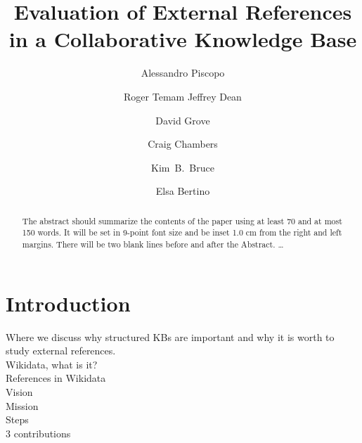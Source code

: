 \documentclass{llncs}
\begin{document}
%
\frontmatter          %
%
\pagestyle{headings}  %
%
%
\mainmatter              %
%
\title{Evaluation of External References in a Collaborative Knowledge Base}
%
%
\author{Alessandro Piscopo \and Roger Temam
Jeffrey Dean \and David Grove \and Craig Chambers \and Kim~B.~Bruce \and
Elsa Bertino}
%
%
%

\maketitle              %

\begin{abstract}
The abstract should summarize the contents of the paper
using at least 70 and at most 150 words. It will be set in 9-point
font size and be inset 1.0 cm from the right and left margins.
There will be two blank lines before and after the Abstract. \dots
{}
\end{abstract}
%
\section{Introduction}
%
Where we discuss why structured KBs are important and why it is worth to study external references.\\
Wikidata, what is it?\\
References in Wikidata\\
Vision\\
Mission\\
Steps\\
3 contributions\\
\end{document}
